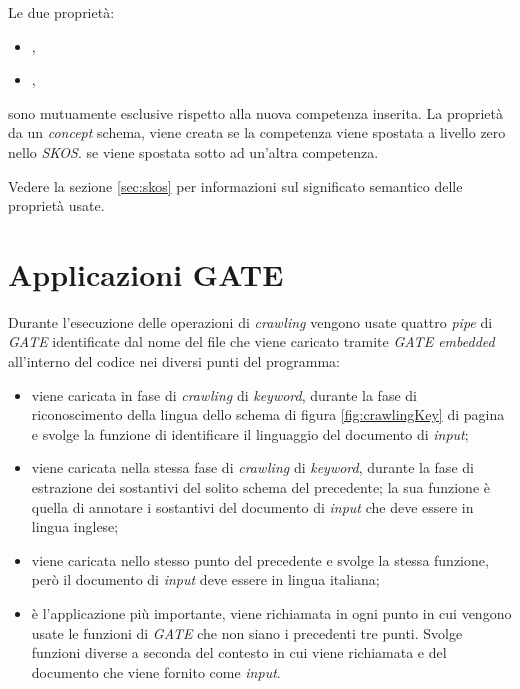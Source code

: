 \documentclass[tesi.tex]{subfiles}
\begin{document}
Le due propriet\`a:
\begin{itemize}
\item {},
\item {},
\end{itemize}
sono mutuamente esclusive rispetto alla nuova competenza inserita.
La propriet\`a  da un \emph{concept} schema,
viene creata se la competenza viene spostata a livello zero nello
\emph{SKOS}.  se viene spostata sotto ad un'altra
competenza.

Vedere la sezione \ref{sec:skos} per informazioni sul significato
semantico delle propriet\`a usate.

\section{Applicazioni GATE}\label{sec:applicazionigate}
Durante l'esecuzione delle operazioni di \emph{crawling} vengono usate
quattro \emph{pipe} di \emph{GATE} identificate dal nome del file che
viene caricato tramite \emph{GATE embedded} all'interno del codice nei
diversi punti del programma:
\begin{itemize}
\item {} viene caricata in fase di
  \emph{crawling} di \emph{keyword}, durante la fase di riconoscimento
  della lingua dello schema di figura \ref{fig:crawlingKey} di pagina
  \pageref{fig:crawlingKey} e svolge la funzione di identificare il
  linguaggio del documento di \emph{input};
\item {} viene caricata nella stessa fase di
  \emph{crawling} di \emph{keyword}, durante la fase di estrazione dei
  sostantivi del solito schema del precedente; la sua funzione \`e quella di
  annotare i sostantivi del documento di \emph{input} che deve essere in
  lingua inglese;
\item {} viene caricata nello stesso punto del precedente
  e svolge la stessa funzione, per\`o il documento di \emph{input} deve
  essere in lingua italiana;
\item {} \`e l'applicazione pi\`u
  importante, viene richiamata in ogni punto in cui vengono usate le
  funzioni di \emph{GATE} che non siano i precedenti tre punti. Svolge
  funzioni diverse a seconda del contesto in cui viene richiamata e
  del documento che viene fornito come \emph{input}.
\end{itemize}
\end{document}

